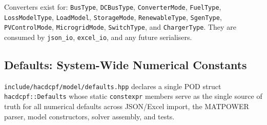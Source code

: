 Converters exist for: \texttt{BusType}, \texttt{DCBusType}, \texttt{ConverterMode},
\texttt{FuelType}, \texttt{LossModelType}, \texttt{LoadModel}, \texttt{StorageMode},
\texttt{RenewableType}, \texttt{SgenType}, \texttt{PVControlMode},
\texttt{MicrogridMode}, \texttt{SwitchType}, and \texttt{ChargerType}.
They are consumed by \texttt{json\_io}, \texttt{excel\_io}, and any future
serialisers.

\subsection{Defaults: System-Wide Numerical Constants}
\label{sec:defaults}

\texttt{include/hacdcpf/model/defaults.hpp} declares a single POD struct
\texttt{hacdcpf::Defaults} whose static \texttt{constexpr} members serve as
the single source of truth for all numerical defaults across JSON/Excel import,
the MATPOWER parser, model constructors, solver assembly, and tests.

